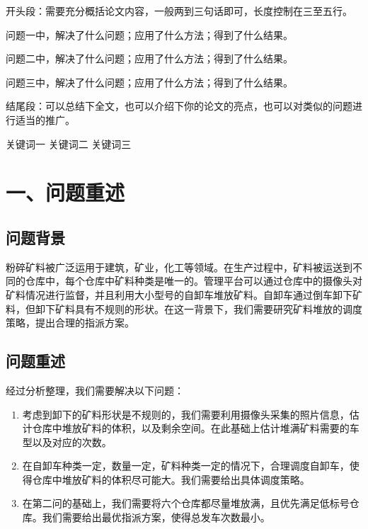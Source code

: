 \documentclass{my_paper}
\begin{document}
\newpage

\begin{center}
\lunwenbiaoti

\vspace{2ex}
\zhaiyao
\end{center}

开头段：需要充分概括论文内容，一般两到三句话即可，长度控制在三至五行。

问题一中，解决了什么问题；应用了什么方法；得到了什么结果。

问题二中，解决了什么问题；应用了什么方法；得到了什么结果。

问题三中，解决了什么问题；应用了什么方法；得到了什么结果。

结尾段：可以总结下全文，也可以介绍下你的论文的亮点，也可以对类似的问题进行适当的推广。

\begin{guanjianci}
关键词一 \quad 关键词二 \quad 关键词三
\end{guanjianci}

\newpage
\section{一、问题重述}

\subsection{问题背景}
粉碎矿料被广泛运用于建筑，矿业，化工等领域。在生产过程中，矿料被运送到不同的仓库中，每个仓库中矿料种类是唯一的。管理平台可以通过仓库中的摄像头对矿料情况进行监督，并且利用大小型号的自卸车堆放矿料。自卸车通过倒车卸下矿料，但卸下矿料具有不规则的形状。在这一背景下，我们需要研究矿料堆放的调度策略，提出合理的指派方案。

\subsection{问题重述}
经过分析整理，我们需要解决以下问题：
\begin{enumerate}
    \item 考虑到卸下的矿料形状是不规则的，我们需要利用摄像头采集的照片信息，估计仓库中堆放矿料的体积，以及剩余空间。在此基础上估计堆满矿料需要的车型以及对应的次数。
    \item 在自卸车种类一定，数量一定，矿料种类一定的情况下，合理调度自卸车，使得仓库中堆放矿料的体积尽可能大。我们需要给出具体调度策略。
    \item 在第二问的基础上，我们需要将六个仓库都尽量堆放满，且优先满足低标号仓库。我们需要给出最优指派方案，使得总发车次数最小。
\end{enumerate}
\end{document}
